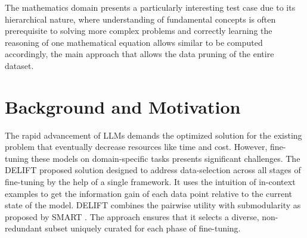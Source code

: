 \documentclass{article}
\begin{document}
The mathematics domain presents a particularly interesting test case due to its hierarchical nature, where understanding of fundamental concepts is often prerequisite to solving more complex problems and correctly learning the reasoning of one mathematical equation allows similar to be computed accordingly, the main approach that allows the data pruning of the entire dataset. 

\section{Background and Motivation}

The rapid advancement of LLMs demands the optimized solution for the existing problem that eventually decrease resources like time and cost. However, fine-tuning these models on domain-specific tasks presents significant challenges. The DELIFT \cite{agarwal2024delift} proposed solution designed to address data-selection across all stages of fine-tuning by the help of a single framework. It uses the intuition of in-context examples to get the information gain of each data point relative to the current state of the model. DELIFT \cite{agarwal2024delift} combines the pairwise utility with submodularity as proposed by SMART \cite{renduchintala2024smart}. The approach ensures that it selects a diverse, non-redundant subset uniquely curated for each phase of fine-tuning.
\end{document}
